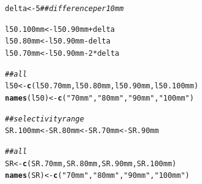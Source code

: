 \documentclass[12pt]{article}\usepackage[]{graphicx}\usepackage[]{color}
\makeatletter
\newcommand{\hlnum}[1]{\textcolor[rgb]{0.686,0.059,0.569}{#1}}%
\newcommand{\hlstr}[1]{\textcolor[rgb]{0.192,0.494,0.8}{#1}}%
\newcommand{\hlcom}[1]{\textcolor[rgb]{0.678,0.584,0.686}{\textit{#1}}}%
\newcommand{\hlopt}[1]{\textcolor[rgb]{0,0,0}{#1}}%
\newcommand{\hlstd}[1]{\textcolor[rgb]{0.345,0.345,0.345}{#1}}%
\newcommand{\hlkwb}[1]{\textcolor[rgb]{0.69,0.353,0.396}{#1}}%
\newcommand{\hlkwd}[1]{\textcolor[rgb]{0.737,0.353,0.396}{\textbf{#1}}}%
\newenvironment{kframe}{%
 \def\at@end@of@kframe{}%
 \ifinner\ifhmode%
  \def\at@end@of@kframe{\end{minipage}}%
  \begin{minipage}{\columnwidth}%
 \fi\fi%
 \def\FrameCommand##1{\hskip\@totalleftmargin \hskip-\fboxsep
 \colorbox{shadecolor}{##1}\hskip-\fboxsep
     \hskip-\linewidth \hskip-\@totalleftmargin \hskip\columnwidth}%
 \MakeFramed {\advance\hsize-\width
   \@totalleftmargin\z@ \linewidth\hsize
   \@setminipage}}%
 {\par\unskip\endMakeFramed%
 \at@end@of@kframe}
\newenvironment{knitrout}{}{} %
\makeatother
\begin{document}
\begin{knitrout}\footnotesize
{}\color{fgcolor}\begin{kframe}
\begin{alltt}
\hlstd{delta} \hlkwb{<-} \hlnum{5} \hlcom{## difference per 10mm}

\hlstd{l50.100mm} \hlkwb{<-} \hlstd{l50.90mm} \hlopt{+} \hlstd{delta}
\hlstd{l50.80mm} \hlkwb{<-} \hlstd{l50.90mm} \hlopt{-} \hlstd{delta}
\hlstd{l50.70mm} \hlkwb{<-} \hlstd{l50.90mm} \hlopt{-} \hlnum{2} \hlopt{*} \hlstd{delta}

\hlcom{## all }
\hlstd{l50} \hlkwb{<-} \hlkwd{c}\hlstd{(l50.70mm, l50.80mm, l50.90mm, l50.100mm)}
\hlkwd{names}\hlstd{(l50)} \hlkwb{<-} \hlkwd{c}\hlstd{(}\hlstr{"70mm"}\hlstd{,} \hlstr{"80mm"}\hlstd{,} \hlstr{"90mm"}\hlstd{,} \hlstr{"100mm"}\hlstd{)}

\hlcom{## selectivity range}
\hlstd{SR.100mm} \hlkwb{<-} \hlstd{SR.80mm} \hlkwb{<-} \hlstd{SR.70mm} \hlkwb{<-} \hlstd{SR.90mm}

\hlcom{## all}
\hlstd{SR} \hlkwb{<-} \hlkwd{c}\hlstd{(SR.70mm, SR.80mm, SR.90mm, SR.100mm)}
\hlkwd{names}\hlstd{(SR)} \hlkwb{<-} \hlkwd{c}\hlstd{(}\hlstr{"70mm"}\hlstd{,} \hlstr{"80mm"}\hlstd{,} \hlstr{"90mm"}\hlstd{,} \hlstr{"100mm"}\hlstd{)}
\end{alltt}
\end{kframe}
\end{knitrout}
\end{document}
